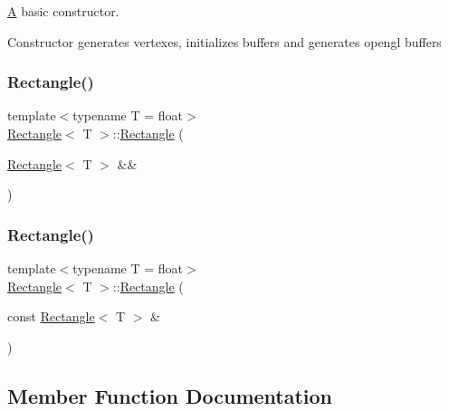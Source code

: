 \mbox{\hyperlink{classA}{A}} basic constructor. 

Constructor generates vertexes, initializes buffers and generates opengl buffers \mbox{\label{classRectangle_a34cf921863291153b40d9b447f812aa4}} 
\subsubsection{\texorpdfstring{Rectangle()}{Rectangle()}\hspace{0.1cm}{\footnotesize\ttfamily [2/3]}}
{\footnotesize\ttfamily template$<$typename T  = float$>$ \\
\mbox{\hyperlink{classRectangle}{Rectangle}}$<$ T $>$\+::\mbox{\hyperlink{classRectangle}{Rectangle}} (\begin{DoxyParamCaption}\item[{\mbox{\hyperlink{classRectangle}{Rectangle}}$<$ T $>$ \&\&}]{ }\end{DoxyParamCaption})\hspace{0.3cm}{\ttfamily [default]}}

\mbox{\label{classRectangle_acf27dae8f7c9a022428bda816903db2e}} 
\subsubsection{\texorpdfstring{Rectangle()}{Rectangle()}\hspace{0.1cm}{\footnotesize\ttfamily [3/3]}}
{\footnotesize\ttfamily template$<$typename T  = float$>$ \\
\mbox{\hyperlink{classRectangle}{Rectangle}}$<$ T $>$\+::\mbox{\hyperlink{classRectangle}{Rectangle}} (\begin{DoxyParamCaption}\item[{const \mbox{\hyperlink{classRectangle}{Rectangle}}$<$ T $>$ \&}]{ }\end{DoxyParamCaption})\hspace{0.3cm}{\ttfamily [default]}}



\subsection{Member Function Documentation}
\mbox{\label{classRectangle_a0f9d67fb9478883f067c47cdc7bf7bca}} 
